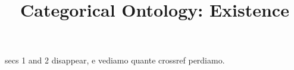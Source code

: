 \documentclass[a4paper]{../birkjour}
\title{Categorical Ontology: Existence}
\begin{document}

\maketitle

\tableofcontents
{\color{red} secs 1 and 2 disappear, e vediamo quante crossref perdiamo.}
  
  
  
  
  \appendix
  
 
  {}
  
\end{document}
